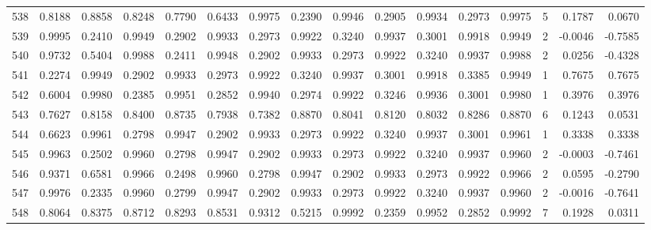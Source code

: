 \begin{tabular}{lrrrrrrrrrrrrrrr}
538 &      0.8188 &  0.8858 &  0.8248 &  0.7790 &  0.6433 &  0.9975 &  0.2390 &  0.9946 &  0.2905 &  0.9934 &   0.2973 &     0.9975 &      5 &                    0.1787 &                     0.0670 \\
539 &      0.9995 &  0.2410 &  0.9949 &  0.2902 &  0.9933 &  0.2973 &  0.9922 &  0.3240 &  0.9937 &  0.3001 &   0.9918 &     0.9949 &      2 &                   -0.0046 &                    -0.7585 \\
540 &      0.9732 &  0.5404 &  0.9988 &  0.2411 &  0.9948 &  0.2902 &  0.9933 &  0.2973 &  0.9922 &  0.3240 &   0.9937 &     0.9988 &      2 &                    0.0256 &                    -0.4328 \\
541 &      0.2274 &  0.9949 &  0.2902 &  0.9933 &  0.2973 &  0.9922 &  0.3240 &  0.9937 &  0.3001 &  0.9918 &   0.3385 &     0.9949 &      1 &                    0.7675 &                     0.7675 \\
542 &      0.6004 &  0.9980 &  0.2385 &  0.9951 &  0.2852 &  0.9940 &  0.2974 &  0.9922 &  0.3246 &  0.9936 &   0.3001 &     0.9980 &      1 &                    0.3976 &                     0.3976 \\
543 &      0.7627 &  0.8158 &  0.8400 &  0.8735 &  0.7938 &  0.7382 &  0.8870 &  0.8041 &  0.8120 &  0.8032 &   0.8286 &     0.8870 &      6 &                    0.1243 &                     0.0531 \\
544 &      0.6623 &  0.9961 &  0.2798 &  0.9947 &  0.2902 &  0.9933 &  0.2973 &  0.9922 &  0.3240 &  0.9937 &   0.3001 &     0.9961 &      1 &                    0.3338 &                     0.3338 \\
545 &      0.9963 &  0.2502 &  0.9960 &  0.2798 &  0.9947 &  0.2902 &  0.9933 &  0.2973 &  0.9922 &  0.3240 &   0.9937 &     0.9960 &      2 &                   -0.0003 &                    -0.7461 \\
546 &      0.9371 &  0.6581 &  0.9966 &  0.2498 &  0.9960 &  0.2798 &  0.9947 &  0.2902 &  0.9933 &  0.2973 &   0.9922 &     0.9966 &      2 &                    0.0595 &                    -0.2790 \\
547 &      0.9976 &  0.2335 &  0.9960 &  0.2799 &  0.9947 &  0.2902 &  0.9933 &  0.2973 &  0.9922 &  0.3240 &   0.9937 &     0.9960 &      2 &                   -0.0016 &                    -0.7641 \\
548 &      0.8064 &  0.8375 &  0.8712 &  0.8293 &  0.8531 &  0.9312 &  0.5215 &  0.9992 &  0.2359 &  0.9952 &   0.2852 &     0.9992 &      7 &                    0.1928 &                     0.0311 \\

\end{tabular}
